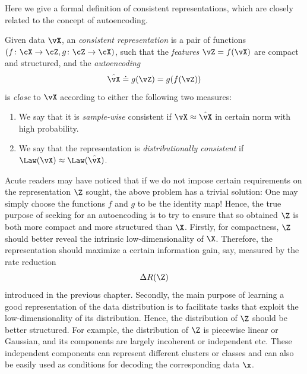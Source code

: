 \documentclass[../../book-main.tex]{subfiles}
\begin{document}
Here we give a formal definition of consistent representations, which
are closely related to the concept of autoencoding. %
\begin{definition}\label{def:bidirectional_rep}
  Given data \(\vX\), an \textit{consistent representation} is a pair
  of functions \((f \colon \cX \to \cZ, g \colon \cZ \to \cX)\), such
  that the \textit{features} \(\vZ = f(\vX)\) are compact and
  structured, and the \textit{autoencoding} \[\hat{\vX} \doteq g(\vZ)
  = g(f(\vZ))\] is \textit{close} to \(\vX\) according to either the
  following two measures:
  \begin{enumerate}
    \item We say that it is \textit{sample-wise} consistent if \(\vX
      \approx \hat{\vX}\) in certain norm with high probability.
    \item We say that the representation is \textit{distributionally
      consistent} if \(\Law(\vX) \approx \Law(\hat{\vX})\).
  \end{enumerate}
\end{definition}

Acute readers may have noticed that if we do not impose certain
requirements on the representation $\Z$ sought, the above problem has
a trivial solution: One may simply choose the functions $f$ and $g$
to be the identity map! Hence, the true purpose of seeking for an
autoencoding is to try to ensure that so obtained $\Z$ is both more
compact and more structured than $\X$. Firstly, for compactness, $\Z$
should better reveal the intrinsic low-dimensionality of $\X$.
Therefore, the representation should maximize a certain information
gain, say, measured by the rate reduction
\begin{equation}
  \Delta R(\Z)
\end{equation}
introduced in the previous chapter. Secondly, the main purpose of
learning a good representation of the data distribution is to
facilitate tasks that exploit the low-dimensionality of its
distribution. Hence, the distribution of $\Z$ should be better
structured. For example, the distribution of $\Z$ is piecewise linear
or Gaussian, and its components are largely incoherent or independent
etc. These independent components can represent different clusters or
classes and can also be easily used as conditions for decoding the
corresponding data $\x$.
\end{document}
